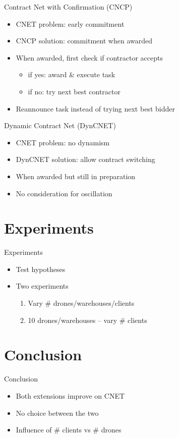 \documentclass{beamer}
\begin{document}
	\begin{frame}{Contract Net with Confirmation (CNCP)}
		\begin{itemize}
			\item CNET problem: early commitment
			\item CNCP solution: commitment when awarded
			\item When awarded, first check if contractor accepts
			\begin{itemize}
				\item if yes: award \& execute task
				\item if no: try next best contractor
			\end{itemize}
		\end{itemize}
		\begin{itemize}
			\item Reannounce task instead of trying next best bidder
		\end{itemize}
	\end{frame}

	\begin{frame}{Dynamic Contract Net (DynCNET)}
		\begin{itemize}
			\item CNET problem: no dynamism
			\item DynCNET solution: allow contract switching
			\item When awarded but still in preparation
		\end{itemize}
		\begin{itemize}			\item No consideration for oscillation
		\end{itemize}
	\end{frame}
	

	
	\section{Experiments}
	\begin{frame}{Experiments}
		\begin{itemize}
			\item Test hypotheses
			\item Two experiments
			\begin{enumerate}
				\item Vary \# drones/warehouses/clients
				\item 10 drones/warehouses -- vary \# clients
			\end{enumerate}
		\end{itemize}
	\end{frame}
	
	\section{Conclusion}
	\begin{frame}{Conclusion}
		\begin{itemize}
			\item Both extensions improve on CNET
			\item No choice between the two
			\item Influence of \# clients vs \# drones
		\end{itemize}
	\end{frame}
	
\end{document}
